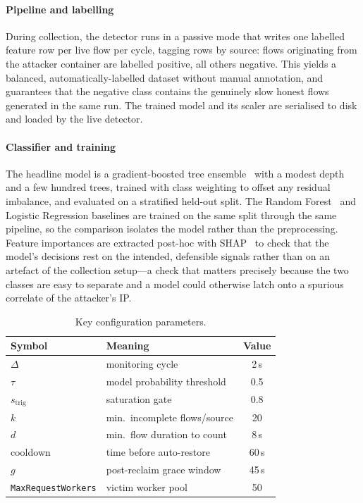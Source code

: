 \documentclass[conference]{IEEEtran}
\begin{document}
\paragraph{Pipeline and labelling} During collection, the detector runs in a
passive mode that writes one labelled feature row per live flow per cycle, tagging
rows by source: flows originating from the attacker container are labelled
positive, all others negative. This yields a balanced, automatically-labelled
dataset without manual annotation, and guarantees that the negative class contains
the genuinely slow honest flows generated in the same run. The trained model and
its scaler are serialised to disk and loaded by the live detector.

\paragraph{Classifier and training} The headline model is a gradient-boosted tree
ensemble~\cite{chen2016xgboost} with a modest depth and a few hundred trees, trained
with class weighting to offset any residual imbalance, and evaluated on a stratified
held-out split. The Random Forest~\cite{breiman2001rf} and Logistic Regression
baselines are trained on the same split through the same pipeline, so the comparison
isolates the model rather than the preprocessing. Feature importances are extracted
post-hoc with SHAP~\cite{lundberg2017shap} to check that the model's decisions rest
on the intended, defensible signals rather than on an artefact of the collection
setup---a check that matters precisely because the two classes are easy to separate
and a model could otherwise latch onto a spurious correlate of the attacker's IP.

\begin{table}[t]
\caption{Key configuration parameters.}
\label{tab:params}
\centering
\footnotesize
\begin{tabular}{@{}llc@{}}
\toprule
Symbol & Meaning & Value \\
\midrule
$\Delta$          & monitoring cycle              & 2\,s \\
$\tau$            & model probability threshold   & 0.5 \\
$s_{\text{trig}}$ & saturation gate               & 0.8 \\
$k$               & min.\ incomplete flows/source & 20 \\
$d$               & min.\ flow duration to count  & 8\,s \\
cooldown          & time before auto-restore      & 60\,s \\
$g$               & post-reclaim grace window     & 45\,s \\
\texttt{MaxRequestWorkers} & victim worker pool   & 50 \\
\bottomrule
\end{tabular}
\end{table}
\end{document}
